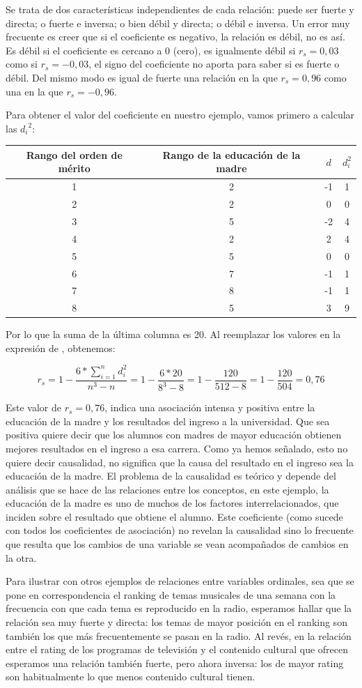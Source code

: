 \documentclass[]{book}
\begin{document}
Se trata de dos características independientes de cada relación: puede
ser fuerte y directa; o fuerte e inversa; o bien débil y directa; o
débil e inversa. Un error muy frecuente es creer que si el coeficiente
es negativo, la relación es débil, no es así. Es débil si el coeficiente
es cercano a 0 (cero), es igualmente débil si \(r_s=0,03\) como si
\(r_s=-0,03\), el signo del coeficiente no aporta para saber si es fuerte
o débil. Del mismo modo es igual de fuerte una relación en la que
\(r_s=0,96\) como una en la que \(r_s=-0,96\).

Para obtener el valor del coeficiente en nuestro ejemplo, vamos primero
a calcular las \({d_{i}}^{2}\):

\begin{longtable}[]{@{}cccc@{}}
\toprule
Rango del orden de mérito & Rango de la educación de la madre & \(d\) & \(d_i^2\)\tabularnewline
\midrule
\endhead
1 & 2 & -1 & 1\tabularnewline
2 & 2 & 0 & 0\tabularnewline
3 & 5 & -2 & 4\tabularnewline
4 & 2 & 2 & 4\tabularnewline
5 & 5 & 0 & 0\tabularnewline
6 & 7 & -1 & 1\tabularnewline
7 & 8 & -1 & 1\tabularnewline
8 & 5 & 3 & 9\tabularnewline
\bottomrule
\end{longtable}

Por lo que la suma de la última columna es 20. Al reemplazar los valores
en la expresión de , obtenemos:

\[r_{s} = 1 - \frac{6*\sum_{i = 1}^{n}d_{i}^{2}}{n^{3} - n} = 1 - \frac{6*20}{8^{3} - 8} = 1 - \frac{120}{512 - 8} = 1 - \frac{120}{504} = 0,76\]

Este valor de \(r_{s} = 0,76\), indica una asociación intensa y positiva
entre la educación de la madre y los resultados del ingreso a la
universidad. Que sea positiva quiere decir que los alumnos con madres de
mayor educación obtienen mejores resultados en el ingreso a esa carrera.
Como ya hemos señalado, esto no quiere decir causalidad, no significa
que la causa del resultado en el ingreso sea la educación de la madre.
El problema de la causalidad es teórico y depende del análisis que se
hace de las relaciones entre los conceptos, en este ejemplo, la
educación de la madre es uno de muchos de los factores
interrelacionados, que inciden sobre el resultado que obtiene el alumno.
Este coeficiente (como sucede con todos los coeficientes de asociación)
no revelan la causalidad sino lo frecuente que resulta que los cambios
de una variable se vean acompañados de cambios en la otra.

Para ilustrar con otros ejemplos de relaciones entre variables
ordinales, sea que se pone en correspondencia el ranking de temas
musicales de una semana con la frecuencia con que cada tema es
reproducido en la radio, esperamos hallar que la relación sea muy fuerte
y directa: los temas de mayor posición en el ranking son también los que
más frecuentemente se pasan en la radio. Al revés, en la relación entre
el rating de los programas de televisión y el contenido cultural que
ofrecen esperamos una relación también fuerte, pero ahora inversa: los
de mayor rating son habitualmente lo que menos contenido cultural
tienen.
\end{document}

